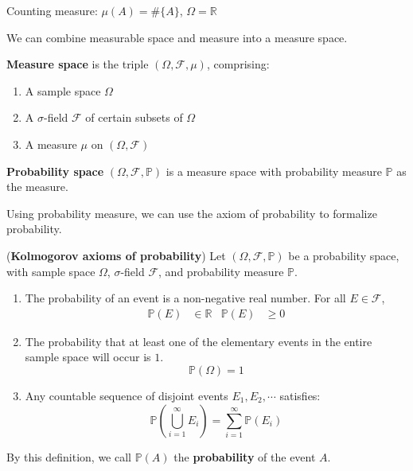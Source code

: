 \documentclass{huhtakm-template-book}
\newcommand{\prob}{\mathbb{P}}
\begin{document}
\begin{eg}
	Counting measure: $\mu(A)=\#\{A\}$, $\Omega=\mathbb{R}$
\end{eg}
We can combine measurable space and measure into a measure space.
\begin{defn}
	\textbf{Measure space} is the triple $(\Omega,\mathcal{F},\mu)$, comprising:
	\begin{enumerate}
		\item A sample space $\Omega$
		\item A $\sigma$-field $\mathcal{F}$ of certain subsets of $\Omega$
		\item A measure $\mu$ on $(\Omega,\mathcal{F})$
	\end{enumerate}
	\textbf{Probability space} $(\Omega,\mathcal{F},\prob)$ is a measure space with probability measure $\prob$ as the measure.
\end{defn}
Using probability measure, we can use the axiom of probability to formalize probability.
\begin{defn}(\textbf{Kolmogorov axioms of probability})
	\label{Kolmogorov axioms}
	Let $(\Omega,\mathcal{F},\prob)$ be a probability space, with sample space $\Omega$, $\sigma$-field $\mathcal{F}$, and probability measure $\prob$.
	\begin{enumerate}
		\item The probability of an event is a non-negative real number. For all $E\in\mathcal{F}$,
		\begin{align*}
			\prob(E)&\in\mathbb{R} & \prob(E)&\geq 0
		\end{align*}
		\item The probability that at least one of the elementary events in the entire sample space will occur is $1$.
		\begin{equation*}
			\prob(\Omega)=1
		\end{equation*}
		\item Any countable sequence of disjoint events $E_{1},E_{2},\cdots$ satisfies:
		\begin{equation*}
			\prob\left(\bigcup_{i=1}^{\infty}E_{i}\right)=\sum_{i=1}^{\infty}\prob(E_{i})
		\end{equation*}
	\end{enumerate}
	By this definition, we call $\prob(A)$ the \textbf{probability} of the event $A$.
\end{defn}
\end{document}
